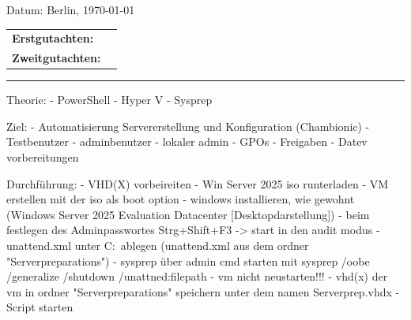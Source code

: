 \documentclass[conference]{IEEEtran}
\begin{document}
\begin{titlepage}
    \begin{center}
        {\Large Datum: Berlin, \today}
    \end{center}


\begin{center}
    \begin{tabular}{ll}
        {\bfseries\large Erstgutachten:} &  \\
        {\bfseries\large Zweitgutachten:} &  \\
    \end{tabular}
\end{center}


    \textcolor{HKS66}{\rule{\linewidth}{0.4mm}}

\end{titlepage}


\newpage

Theorie:
- PowerShell
- Hyper V 
- Sysprep

Ziel:
- Automatisierung Servererstellung und Konfiguration (Chambionic)
    - Testbenutzer
    - adminbenutzer
    - lokaler admin
    - GPOs
    - Freigaben
    - Datev vorbereitungen

Durchführung:
- VHD(X) vorbeireiten
    - Win Server 2025 iso runterladen
    - VM erstellen mit der iso als boot option
    - windows installieren, wie gewohnt (Windows Server 2025 Evaluation Datacenter [Desktopdarstellung])
    - beim festlegen des Adminpasswortes Strg+Shift+F3 -> start in den audit modus
    - unattend.xml unter C:\ ablegen (unattend.xml aus dem ordner "Serverpreparations")
    - sysprep über admin cmd starten mit sysprep /oobe /generalize /shutdown /unattned:filepath
    - vm nicht neustarten!!!
    - vhd(x) der vm in ordner "Serverpreparations" speichern unter dem namen Serverprep.vhdx
- Script starten


\end{document}
